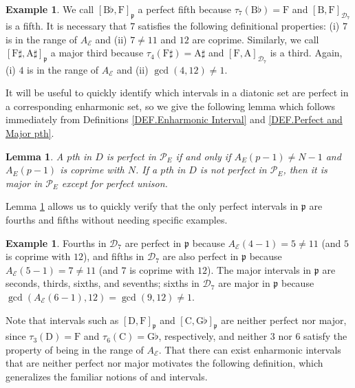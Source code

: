 \documentclass{article}
\theoremstyle{plain}
\newtheorem{lemma}[theorem]{Lemma}
\theoremstyle{definition}
\newtheorem{example}[theorem]{Example}
\theoremstyle{remark}
\begin{document}
\begin{example}
	We call $[\textrm{B}\flat,\textrm{F}]_{\mathfrak{p}}$ a perfect fifth because $\tau_7(\textrm{B}\flat)=\textrm{F}$ and $[\textrm{B},\textrm{F}]_{\mathcal{D}_7}$ is a fifth. It is necessary that $7$ satisfies the following definitional properties: (i) $7$ is in the range of $A_\mathcal{E}$ and (ii) $7\ne 11$ and $12$ are coprime. Similarly, we call $[\textrm{F}\sharp,\textrm{A}\sharp]_{\mathfrak{p}}$ a major third because $\tau_4(\textrm{F}\sharp)=\textrm{A}\sharp$ and $[\textrm{F},\textrm{A}]_{\mathcal{D}_7}$ is a third. Again, (i) $4$ is in the range of $A_\mathcal{E}$ and (ii) $\gcd{(4,12)}\ne 1$.
\end{example}

It will be useful to quickly identify which intervals in a diatonic set are perfect in a corresponding enharmonic set, so we give the following lemma which follows immediately from Definitions \ref{DEF.Enharmonic Interval} and \ref{DEF.Perfect and Major pth}.

\begin{lemma}
\label{LEM.Identifying pths}
	A $p$th in $D$ is perfect in $\mathcal{P}_E$ if and only if $A_E(p-1)\ne N-1$ and $A_E(p-1)$ is coprime with $N$. If a $p$th in $D$ is not perfect in $\mathcal{P}_E$, then it is major in $\mathcal{P}_E$ except for perfect unison.
\end{lemma}

Lemma \ref{LEM.Identifying pths} allows us to quickly verify that the only perfect intervals in $\mathfrak{p}$ are fourths and fifths without needing specific examples.

\begin{example}
	Fourths in $\mathcal{D}_7$ are perfect in $\mathfrak{p}$ because $A_\mathcal{E}(4-1)=5\ne 11$ (and $5$ is coprime with $12$), and fifths in $\mathcal{D}_7$ are also perfect in $\mathfrak{p}$ because $A_\mathcal{E}(5-1)=7\ne 11$ (and $7$ is coprime with $12$). The major intervals in $\mathfrak{p}$ are seconds, thirds, sixths, and sevenths; sixths in $\mathcal{D}_7$ are major in $\mathfrak{p}$ because $\gcd{(A_\mathcal{E}(6-1),12)}=\gcd{(9,12)}\ne 1$.
\end{example}

Note that intervals such as $[\textrm{D},\textrm{F}]_{\mathfrak{p}}$ and $[\textrm{C},\textrm{G}\flat]_{\mathfrak{p}}$ are neither perfect nor major, since $\tau_3(\textrm{D})=\textrm{F}$ and $\tau_6(\textrm{C})=\textrm{G}\flat$, respectively, and neither $3$ nor $6$ satisfy the property of being in the range of $A_\mathcal{E}$. That there can exist enharmonic intervals that are neither perfect nor major motivates the following definition, which generalizes the familiar notions of   and  intervals.
\end{document}
